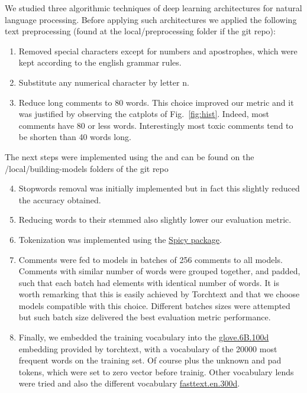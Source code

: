 \documentclass{report}
\begin{document}
We studied three algorithmic techniques of deep learning architectures for natural
language processing. Before applying such architectures we applied the following 
text preprocessing (found at the local/preprocessing folder if the git repo):
\begin{enumerate}
\item Removed special characters except for numbers and apostrophes, which
were kept according to the english grammar rules.
\item Substitute any numerical character by letter n.
\item Reduce long comments to 80 words. This choice improved our metric 
and it was justified by observing the catplots of Fig.~\ref{fig:hist}. Indeed, 
most comments have 80 or less words. Interestingly most toxic comments tend 
to be shorten than 40 words long.
\end{enumerate}
The next steps were implemented using the \cite{Torchtext} and 
can be found on the /local/building-models folders of the git repo
\begin{enumerate}
 \setcounter{enumi}{3}
\item Stopwords removal was initially implemented but in fact this slightly reduced the
accuracy obtained. 
\item Reducing words to their stemmed also slightly lower our evaluation metric.
\item Tokenization was implemented using the \href{https://scipy.org/scipylib/}{Spicy package}.
\item Comments were fed to models in batches of 256 comments to all models. Comments
 with similar number of words were grouped together, and padded, such that 
each batch had elements with identical number of words. It is worth remarking that this is
easily achieved by Torchtext and that we choose models compatible with this choice. Different 
batches sizes were attempted but such batch size delivered the best evaluation metric performance. 

\item Finally, we embedded the training vocabulary into the 
\href{https://nlp.stanford.edu/projects/glove/}{glove.6B.100d} embedding 
provided by torchtext, with a vocabulary of the 20000 most frequent words on the
training set. Of course plus the unknown and pad tokens, which were set to zero vector before trainig. 
Other vocabulary lends were tried and also the different vocabulary \href{https://fasttext.cc/}{fasttext.en.300d}. 

\end{enumerate}
\end{document}
